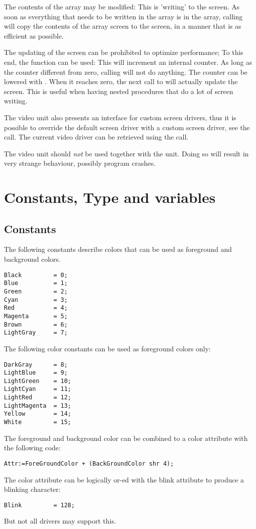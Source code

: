 The contents of the  array may be modified: This is 'writing'
to the screen. As soon as everything that needs to be written in the array
is in the  array, calling  will copy the
contents of the array screen to the screen, in a manner that is as efficient
as possible.

The updating of the screen can be prohibited to optimize performance; To
this end, the  function can be used: This will
increment an internal counter. As long as the counter different from zero,
calling  will not do anything. The counter can be
lowered with . When it reaches zero, the next call
to  will actually update the screen. This is useful when
having nested procedures that do a lot of screen writing.

The video unit also presents an interface for custom screen drivers, thus
it is possible to override the default screen driver with a custom screen 
driver, see the  call. The current video driver can
be retrieved using the  call.

\begin{remark}
The video unit should {\em not} be used together with the  unit.
Doing so will result in very strange behaviour, possibly program crashes.
\end{remark}

\section{Constants, Type and variables }

\subsection{Constants}
\label{vidcolorconst}
The following constants describe colors that can be used as 
foreground and background colors.
\begin{verbatim}
Black         = 0;
Blue          = 1;
Green         = 2;
Cyan          = 3;
Red           = 4;
Magenta       = 5;
Brown         = 6;
LightGray     = 7;
\end{verbatim}
The following color constants can be used as foreground colors only:
\begin{verbatim}
DarkGray      = 8;
LightBlue     = 9;
LightGreen    = 10;
LightCyan     = 11;
LightRed      = 12;
LightMagenta  = 13;
Yellow        = 14;
White         = 15;
\end{verbatim}
The foreground and background color can be combined to a color attribute
with the following code:
\begin{verbatim}
Attr:=ForeGroundColor + (BackGroundColor shr 4);
\end{verbatim}
The color attribute can be logically or-ed with the blink attribute to
produce a blinking character:
\begin{verbatim}
Blink         = 128;
\end{verbatim}
But not all drivers may support this.

